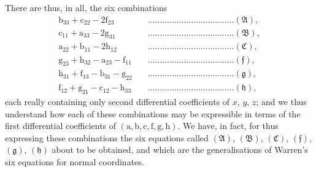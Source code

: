 \documentclass[11pt,a4paper]{article}
\begin{document}
There are thus, in all, the six combinations
\begin{align*}
\text{b}_{33} + \text{c}_{22} - 2\text{f}_{23} & \quad\ldots\ldots\ldots\ldots\ldots\ldots\ldots\ldots\ldots\ldots\ldots\ldots (\mathfrak{A}),\\
\text{c}_{11} + \text{a}_{33} - 2\text{g}_{31} & \quad\ldots\ldots\ldots\ldots\ldots\ldots\ldots\ldots\ldots\ldots\ldots\ldots (\mathfrak{B}),\\
\text{a}_{22} + \text{b}_{11} - 2\text{h}_{12} & \quad\ldots\ldots\ldots\ldots\ldots\ldots\ldots\ldots\ldots\ldots\ldots\ldots (\mathfrak{C}),\\
\text{g}_{23} + \text{h}_{32} - \text{a}_{23} - \text{f}_{11} & \quad\ldots\ldots\ldots\ldots\ldots\ldots\ldots\ldots\ldots\ldots\ldots\ldots (\mathfrak{f}),\\
\text{h}_{31} + \text{f}_{13} - \text{b}_{31} - \text{g}_{22} & \quad\ldots\ldots\ldots\ldots\ldots\ldots\ldots\ldots\ldots\ldots\ldots\ldots (\mathfrak{g}),\\
\text{f}_{12} + \text{g}_{21} - \text{c}_{12} - \text{h}_{33} & \quad\ldots\ldots\ldots\ldots\ldots\ldots\ldots\ldots\ldots\ldots\ldots\ldots (\mathfrak{h}),
\end{align*}
each really containing only second differential coefficients of $x$, $y$, $z$; and we thus understand how each of these combinations may be expressible in terms of the first differential coefficients of $(\text{a}, \text{b}, \text{c}, \text{f}, \text{g}, \text{h})$. We have, in fact, for thus expressing these combinations the six equations called $(\mathfrak{A})$, $(\mathfrak{B})$, $(\mathfrak{C})$, $(\mathfrak{f})$, $(\mathfrak{g})$, $(\mathfrak{h})$ about to be obtained, and which are the generalisations of Warren's six equations for normal coordinates.

\medskip
\end{document}
